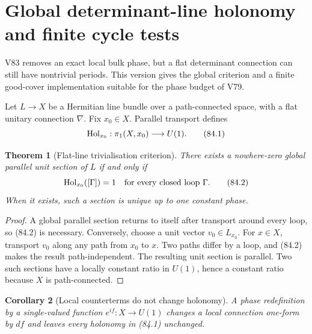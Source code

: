 \documentclass[11pt]{article}
\newtheorem{theorem}{Theorem}[section]
\newtheorem{corollary}[theorem]{Corollary}
\begin{document}

\section{Global determinant-line holonomy and finite cycle tests}
\label{sec:v11v84}

V83 removes an exact local bulk phase, but a flat determinant
connection can still have nontrivial periods.  This version gives the
global criterion and a finite good-cover implementation suitable for
the phase budget of V79.

Let \(L\to X\) be a Hermitian line bundle over a path-connected
space, with a flat unitary connection \(\nabla\).  Fix \(x_0\in X\).
Parallel transport defines
\[
                  {\rm Hol}_{x_0}:\pi_1(X,x_0)\longrightarrow U(1).
                                                                    \tag{84.1}
\]

\begin{theorem}[Flat-line trivialisation criterion]
\label{thm:v11v84-holonomy}
There exists a nowhere-zero global parallel unit section of \(L\) if
and only if
\[
                         {\rm Hol}_{x_0}([\Gamma])=1
                    \quad\text{for every closed loop }\Gamma.       \tag{84.2}
\]
When it exists, such a section is unique up to one constant phase.
\end{theorem}

\begin{proof}
A global parallel section returns to itself after transport around
every loop, so (84.2) is necessary.  Conversely, choose a unit vector
\(v_0\in L_{x_0}\).  For \(x\in X\), transport \(v_0\) along any path
from \(x_0\) to \(x\).  Two paths differ by a loop, and (84.2) makes
the result path-independent.  The resulting unit section is parallel.
Two such sections have a locally constant ratio in \(U(1)\), hence a
constant ratio because \(X\) is path-connected.
\end{proof}

\begin{corollary}[Local counterterms do not change holonomy]
\label{cor:v11v84-counterterm}
A phase redefinition by a single-valued function
\(e^{if}:X\to U(1)\) changes a local connection one-form by \(df\)
and leaves every holonomy in (84.1) unchanged.
\end{corollary}
\end{document}
